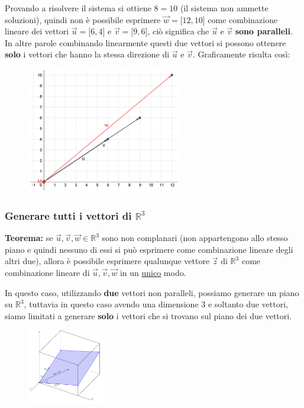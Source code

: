 \documentclass[../main.tex]{subfiles}
\begin{document}
Provando a risolvere il sistema si ottiene $8=10$ (il sistema non ammette soluzioni), quindi non è possibile esprimere
$\vec{w}= \lbrack12,10\rbrack$ come combinazione lineare dei vettori $\vec{u}= \lbrack6,4\rbrack$ e $\vec{v}= \lbrack9,6\rbrack$,
ciò significa che $\vec{u}$ e $\vec{v}$ \textbf{sono paralleli}. In altre parole combinando linearmente questi due vettori si possono ottenere \textbf{solo} i vettori che hanno la stessa direzione di $\vec{u}$ e $\vec{v}$. Graficamente risulta così:
\begin{figure}[h]
    \centering
    \includegraphics[width=0.6\textwidth]{../images/vettoriParalleli.png}
\end{figure}

\subsubsection{Generare tutti i vettori di $\mathbb{R}^3$}
\textbf{Teorema:} se $\vec{u},\vec{v},\vec{w} \in \mathbb{R}^3$ sono non complanari (non appartengono allo stesso piano e quindi nessuno di essi si può  esprimere come combinazione lineare degli altri due), allora è possibile esprimere qualunque vettore $\vec{z}$ di $\mathbb{R}^3$ come combinazione lineare di $\vec{u},\vec{v},\vec{w}$ in un \underline{unico} modo.

In questo caso, utilizzando \textbf{due} vettori non paralleli, possiamo generare un piano su $\mathbb{R}^3$, tuttavia in questo caso
avendo una dimensione 3 e soltanto due vettori, siamo limitati a generare \textbf{solo} i vettori che si trovano sul piano dei due vettori.
\begin{figure}[h]
    \centering
    \includegraphics[width=0.3\textwidth]{../images/combinazioneLineareR3.png}
\end{figure}
\end{document}
